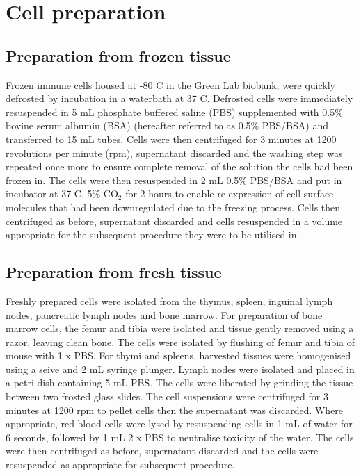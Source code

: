 \section{Cell preparation}
\label{sec:cellprep}

\subsection{Preparation from frozen tissue}

Frozen immune cells housed at -80 \textdegree C in the Green Lab biobank, were quickly defrosted by incubation in a waterbath at 37 \textdegree C.
Defrosted cells were immediately resuspended in 5 mL phosphate buffered saline (PBS) supplemented with 0.5\% bovine serum albumin (BSA) (hereafter referred to as 0.5\% PBS/BSA) and transferred to 15 mL tubes.
Cells were then centrifuged for 3 minutes at 1200 revolutions per minute (rpm), supernatant discarded and the washing step was repeated once more to ensure complete removal of the solution the cells had been frozen in.
The cells were then resuspended in 2 mL 0.5\% PBS/BSA and put in incubator at 37 \textdegree C, 5\% CO$_2$ for 2 hours to enable re-expression of cell-surface molecules that had been downregulated due to the freezing process.
Cells then centrifuged as before, supernatant discarded and cells resuspended in a volume appropriate for the subsequent procedure they were to be utilised in.

\subsection{Preparation from fresh tissue}
Freshly prepared cells were isolated from the thymus, spleen, inguinal lymph nodes, pancreatic lymph nodes and bone marrow.
For preparation of bone marrow cells, the femur and tibia were isolated and tissue gently removed using a razor, leaving clean bone.
The cells were isolated by flushing of femur and tibia of mouse with 1 x PBS.
For thymi and spleens, harvested tissues were homogenised using a seive and 2 mL syringe plunger.
Lymph nodes were isolated and placed in a petri dish containing 5 mL PBS.
The cells were liberated by grinding the tissue between two frosted glass slides.
The cell suspensions were centrifuged for 3 minutes at 1200 rpm to pellet cells then the supernatant was discarded.
Where appropriate, red blood cells were lysed by resuspending cells in 1 mL of water for 6 seconds, followed by 1 mL 2 x PBS to neutralise toxicity of the water.
The cells were then centrifuged as before, supernatant discarded and the cells were resuspended as appropriate for subsequent procedure.


